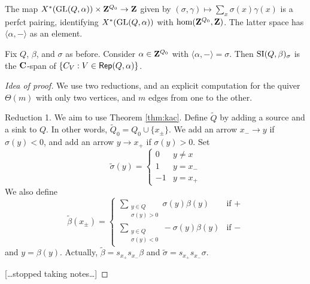 \documentclass{article}
\begin{document}
The map $X^\ast(\operatorname{GL}(Q,\alpha))\times \mathbf{Z}^{Q_0} \to \mathbf{Z}$ given by 
$(\sigma,\gamma)\mapsto \sum_x \sigma(x) \gamma(x)$ is a perfct pairing, 
identifying $X^\ast(\operatorname{GL}(Q,\alpha))$ with $\hom(\mathbf{Z}^{Q_0},\mathbf{Z})$. The 
latter space has $\langle \alpha,-\rangle$ as an element. 

\begin{theorem}
Fix $Q$, $\beta$, and $\sigma$ as before. Consider $\alpha\in \mathbf{Z}^{Q_0}$ with 
$\langle \alpha,-\rangle = \sigma$. Then $\operatorname{SI}(Q,\beta)_\sigma$ is 
the $\mathbf{C}$-span of $\{C_V:V\in \operatorname{\mathsf{Rep}}(Q,\alpha)\}$. 
\end{theorem}
\begin{proof}[Idea of proof]
We use two reductions, and an explicit computation for the quiver $\Theta(m)$ with 
only two vertices, and $m$ edges from one to the other. 

Reduction 1. We aim to use Theorem \ref{thm:kac}. Define $\widetilde Q$ by adding 
a source and a sink to $Q$. In other words, $\widetilde Q_0 = Q_0\cup \{x_\pm\}$. 
We add an arrow $x_- \to y$ if $\sigma(y)<0$, and add an arrow 
$y\to x_+$ if $\sigma(y)>0$. Set 
\[
  \widetilde\sigma(y) = 
  \begin{cases}
    0 & y\ne x \\
    1 & y=x_- \\
    -1 & y=x_+ 
  \end{cases}
\]
We also define 
\[
  \widetilde\beta(x_\pm) = 
  \begin{cases}
    \sum_{\substack{y\in Q \\ \sigma(y)>0}} \sigma(y) \beta(y) & \text{if }+ \\
    \sum_{\substack{y\in Q \\ \sigma(y)<0}} -\sigma(y) \beta(y) & \text{if }- 
  \end{cases}
\]
and $y=\beta(y)$. Actually, 
$\widetilde\beta=s_{x_+}s_{x_-} \beta$ and 
$\widetilde\sigma=s_{x_+}s_{x_-} \sigma$. 

[\ldots stopped taking notes\ldots]
\end{proof}
\end{document}
